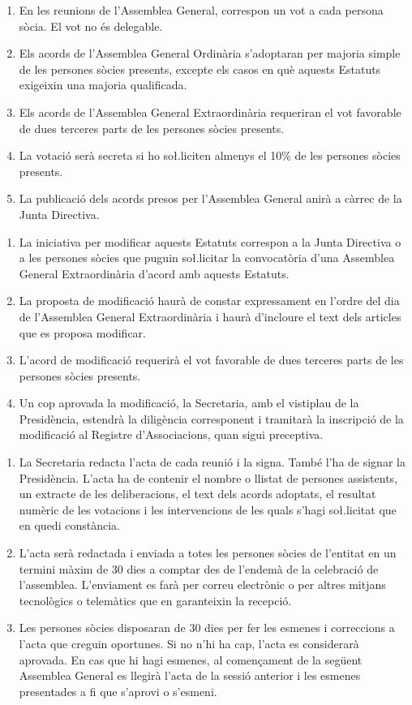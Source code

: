 \documentclass[11pt,a4paper]{article}
\newcommand{\JD}{Junta Directiva\xspace}
\newcommand{\AG}{Assemblea General\xspace}
\newcommand{\AGO}{Assemblea General Ordinària\xspace}
\newcommand{\AGE}{Assemblea General Extraordinària\xspace}
\begin{document}

\begin{enumerate}
    \item En les reunions de l'\AG, correspon un vot a cada persona sòcia. El vot no és delegable.
    \item Els acords de l'\AGO s'adoptaran per majoria simple de les persones sòcies presents, excepte els casos en què aquests Estatuts exigeixin una majoria qualificada.
    \item Els acords de l'\AGE requeriran el vot favorable de dues terceres parts de les persones sòcies presents.
    \item La votació serà secreta si ho so\l.liciten almenys el 10\% de les persones sòcies presents.
    \item La publicació dels acords presos per l'\AG anirà a càrrec de la \JD.
\end{enumerate}


\begin{enumerate}
    \item La iniciativa per modificar aquests Estatuts correspon a la \JD o a les persones sòcies que puguin so\l.licitar la convocatòria d'una \AGE d'acord amb aquests Estatuts.
    \item La proposta de modificació haurà de constar expressament en l'ordre del dia de l'\AGE i haurà d'incloure el text dels articles que es proposa modificar.
    \item L'acord de modificació requerirà el vot favorable de dues terceres parts de les persones sòcies presents.
    \item Un cop aprovada la modificació, la Secretaria, amb el vistiplau de la Presidència, estendrà la diligència corresponent i tramitarà la inscripció de la modificació al Registre d'Associacions, quan sigui preceptiva.
\end{enumerate}


\begin{enumerate}
    \item La Secretaria redacta l'acta de cada reunió i la signa. També l'ha de signar la Presidència. L'acta ha de contenir el nombre o llistat de persones assistents, un extracte de les deliberacions, el text dels acords adoptats, el resultat numèric de les votacions i les intervencions de les quals s'hagi so\l.licitat que en quedi constància.
    \item L'acta serà redactada i enviada a totes les persones sòcies de l'entitat en un termini màxim de 30 dies a comptar des de l'endemà de la celebració de l'assemblea. L'enviament es farà per correu electrònic o per altres mitjans tecnològics o telemàtics que en garanteixin la recepció.
    \item Les persones sòcies disposaran de 30 dies per fer les esmenes i correccions a l'acta que creguin oportunes. Si no n'hi ha cap, l'acta es considerarà aprovada. En cas que hi hagi esmenes, al començament de la següent \AG es llegirà l'acta de la sessió anterior i les esmenes presentades a fi que s'aprovi o s'esmeni.
\end{enumerate}
\end{document}
